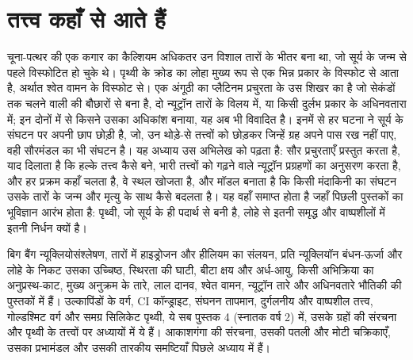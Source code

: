 \chapter{तत्त्व कहाँ से आते हैं}\label{ch:b3:origin-of-elements}

चूना-पत्थर की एक कगार का कैल्शियम अधिकतर उन विशाल तारों के भीतर बना था,
जो सूर्य के जन्म से पहले विस्फोटित हो चुके थे। पृथ्वी के क्रोड का लोहा
मुख्य रूप से एक भिन्न प्रकार के विस्फोट से आता है, अर्थात
श्वेत वामन के विस्फोट से। एक अंगूठी का प्लैटिनम प्रचुरता के उस शिखर का है
जो सेकंडों तक चलने वाली  की बौछारों से बना है, दो न्यूट्रॉन तारों के
विलय में, या किसी दुर्लभ प्रकार के अधिनवतारा में; इन दोनों में से किसने उसका अधिकांश
बनाया, यह अब भी विवादित है।
इनमें से हर घटना ने सूर्य के संघटन पर अपनी छाप छोड़ी है,
जो, उन थोड़े-से तत्त्वों को छोड़कर जिन्हें ग्रह अपने पास रख नहीं पाए, वही
सौरमंडल का भी संघटन है। यह अध्याय उस अभिलेख को पढ़ता है:
सौर प्रचुरताएँ प्रस्तुत करता है, याद दिलाता है कि हल्के तत्त्व कैसे बने,
भारी तत्त्वों को गढ़ने वाले न्यूट्रॉन प्रग्रहणों का अनुसरण करता है, और
हर प्रक्रम कहाँ चलता है, वे स्थल खोजता है, और मॉडल बनाता है कि किसी
मंदाकिनी का संघटन उसके तारों के जन्म और मृत्यु के साथ कैसे बदलता है। यह वहाँ समाप्त होता है जहाँ
पिछली पुस्तकों का भूविज्ञान आरंभ होता है: पृथ्वी, जो सूर्य के ही पदार्थ से बनी है,
लोहे से इतनी समृद्ध और वाष्पशीलों में इतनी निर्धन क्यों है।

\begin{recall}
बिग बैंग न्यूक्लियोसंश्लेषण, तारों में हाइड्रोजन और हीलियम का संलयन,
प्रति न्यूक्लियॉन बंधन-ऊर्जा और लोहे के निकट उसका उच्चिष्ठ, स्थिरता की
घाटी, बीटा क्षय और अर्ध-आयु, किसी अभिक्रिया का अनुप्रस्थ-काट,
मुख्य अनुक्रम के तारे, लाल दानव, श्वेत वामन, न्यूट्रॉन तारे और
अधिनवतारे भौतिकी की पुस्तकों में हैं। उल्कापिंडों के वर्ग, CI
कॉन्ड्राइट, संघनन तापमान, दुर्गलनीय और वाष्पशील
तत्त्व, गोल्डश्मिट वर्ग और समग्र सिलिकेट पृथ्वी, ये सब
पुस्तक 4 (स्नातक वर्ष 2) में, उसके ग्रहों की संरचना और
पृथ्वी के तत्त्वों पर अध्यायों में ये हैं। आकाशगंगा की संरचना, उसकी पतली और
मोटी चक्रिकाएँ, उसका प्रभामंडल और उसकी तारकीय समष्टियाँ पिछले
अध्याय में हैं।
\end{recall}

